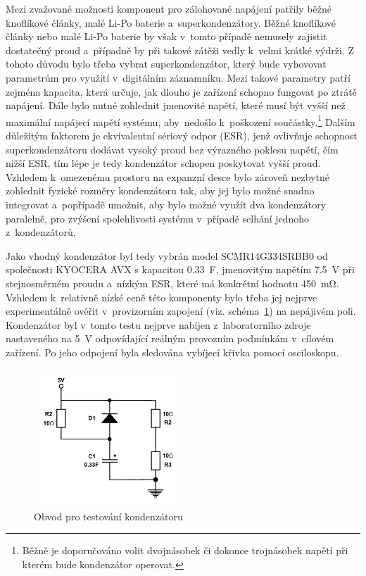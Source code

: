 Mezi zvažované možnosti komponent pro zálohované napájení patřily běžné knoflíkové články, malé Li-Po baterie a~superkondenzátory. Běžné knoflíkové články nebo malé Li-Po baterie by však v~tomto případě nemusely zajistit dostatečný proud a~případně by při takové zátěži vedly k~velmi krátké výdrži. Z tohoto důvodu bylo třeba vybrat superkondenzátor, který bude vyhovovat parametrům pro využití v~digitálním záznamníku. Mezi takové parametry patří zejména kapacita, která určuje, jak dlouho je zařízení schopno fungovat po ztrátě napájení. Dále bylo nutné zohlednit jmenovité napětí, které musí být vyšší než maximální napájecí napětí systému, aby~nedošlo k~poškození součástky.\footnote{Běžně je doporučováno volit dvojnásobek či dokonce trojnásobek napětí při kterém bude kondenzátor operovat.} Dalším důležitým faktorem je ekvivalentní sériový odpor (ESR), jenž ovlivňuje schopnost superkondenzátoru dodávat vysoký proud bez výrazného poklesu napětí, čím nižší ESR, tím lépe je tedy kondenzátor schopen poskytovat vyšší proud. Vzhledem k~omezenému prostoru na expanzní desce bylo zároveň nezbytné zohlednit fyzické rozměry kondenzátoru tak, aby jej bylo možné snadno integrovat a~popřípadě umožnit, aby bylo možné využít dva kondenzátory paralelně, pro zvýšení spolehlivosti systému v~případě selhání jednoho z~kondenzátorů.~\cite{cadence_capacitor_size}

Jako vhodný kondenzátor byl tedy vybrán model SCMR14G334SRBB0 od společnosti KYOCERA AVX s kapacitou \SI{0.33}{\farad}, jmenovitým napětím \SI{7.5}{\volt} při stejnosměrném proudu a~nízkým ESR, které má konkrétní hodnotu \SI{450}{\milli\ohm}. Vzhledem k~relativně nízké ceně této komponenty bylo třeba jej nejprve experimentálně ověřit v~provizorním zapojení (viz. schéma~\ref{fig:test-capacitors}) na nepájivém poli. Kondenzátor byl v~tomto testu nejprve nabíjen z~laboratorního zdroje nastaveného na \SI{5}{\volt} odpovídající reálným provozním podmínkám v~cílovém zařízení. Po jeho odpojení byla sledována vybíjecí křivka pomocí osciloskopu.

\begin{figure}[h]
    \centering
    \includegraphics[width=0.50\textwidth]{obrazky-figures/test_capacitors.pdf}
    
    \caption{Obvod pro testování kondenzátoru}
    \label{fig:test-capacitors}
\end{figure}

